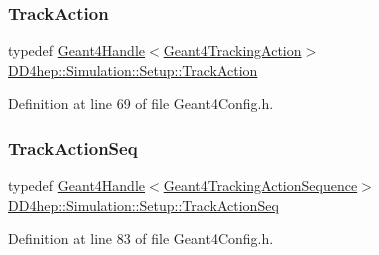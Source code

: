 \subsubsection{\texorpdfstring{Track\+Action}{TrackAction}}
{\footnotesize\ttfamily typedef \hyperlink{class_d_d4hep_1_1_simulation_1_1_geant4_handle}{Geant4\+Handle}$<$\hyperlink{class_d_d4hep_1_1_simulation_1_1_geant4_tracking_action}{Geant4\+Tracking\+Action}$>$ \hyperlink{namespace_d_d4hep_1_1_simulation_1_1_setup_ab8429f4d09699162358a80f1c6d6955f}{D\+D4hep\+::\+Simulation\+::\+Setup\+::\+Track\+Action}}



Definition at line 69 of file Geant4\+Config.\+h.

\hypertarget{namespace_d_d4hep_1_1_simulation_1_1_setup_a5266c2f851adc926f84380c385c8dca4}{}\label{namespace_d_d4hep_1_1_simulation_1_1_setup_a5266c2f851adc926f84380c385c8dca4} 
\subsubsection{\texorpdfstring{Track\+Action\+Seq}{TrackActionSeq}}
{\footnotesize\ttfamily typedef \hyperlink{class_d_d4hep_1_1_simulation_1_1_geant4_handle}{Geant4\+Handle}$<$\hyperlink{class_d_d4hep_1_1_simulation_1_1_geant4_tracking_action_sequence}{Geant4\+Tracking\+Action\+Sequence}$>$ \hyperlink{namespace_d_d4hep_1_1_simulation_1_1_setup_a5266c2f851adc926f84380c385c8dca4}{D\+D4hep\+::\+Simulation\+::\+Setup\+::\+Track\+Action\+Seq}}



Definition at line 83 of file Geant4\+Config.\+h.

